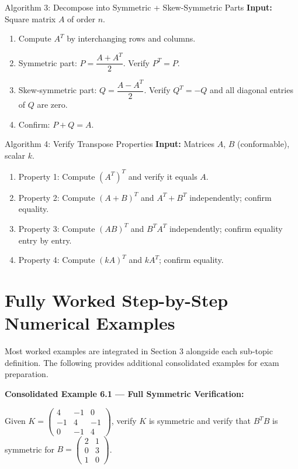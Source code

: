 \documentclass[12pt,a4paper]{article}
\begin{document}
\begin{learnbox}{Algorithm 3: Decompose into Symmetric + Skew-Symmetric Parts}
\textbf{Input:} Square matrix $A$ of order $n$.
\begin{enumerate}
  \item Compute $A^T$ by interchanging rows and columns.
  \item Symmetric part: $P = \dfrac{A + A^T}{2}$. Verify $P^T = P$.
  \item Skew-symmetric part: $Q = \dfrac{A - A^T}{2}$. Verify $Q^T = -Q$ and all diagonal entries of $Q$ are zero.
  \item Confirm: $P + Q = A$.
\end{enumerate}
\end{learnbox}

\begin{learnbox}{Algorithm 4: Verify Transpose Properties}
\textbf{Input:} Matrices $A$, $B$ (conformable), scalar $k$.
\begin{enumerate}
  \item Property 1: Compute $(A^T)^T$ and verify it equals $A$.
  \item Property 2: Compute $(A+B)^T$ and $A^T + B^T$ independently; confirm equality.
  \item Property 3: Compute $(AB)^T$ and $B^T A^T$ independently; confirm equality entry by entry.
  \item Property 4: Compute $(kA)^T$ and $kA^T$; confirm equality.
\end{enumerate}
\end{learnbox}

\section{Fully Worked Step-by-Step Numerical Examples}

Most worked examples are integrated in Section 3 alongside each sub-topic definition. The following provides additional consolidated examples for exam preparation.

\textbf{Consolidated Example 6.1 --- Full Symmetric Verification:}

Given $K = \begin{pmatrix} 4 & -1 & 0 \\ -1 & 4 & -1 \\ 0 & -1 & 4 \end{pmatrix}$, verify $K$ is symmetric and verify that $B^T B$ is symmetric for $B = \begin{pmatrix} 2 & 1 \\ 0 & 3 \\ 1 & 0 \end{pmatrix}$.
\end{document}
